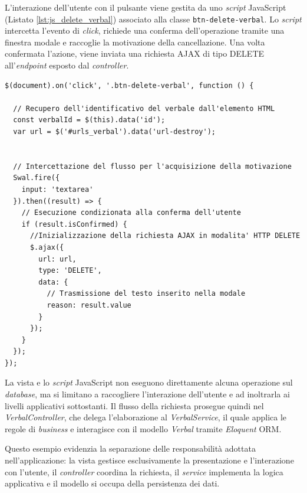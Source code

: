 L'interazione dell'utente con il pulsante viene gestita da uno \textit{script} JavaScript (Listato \ref{lst:js_delete_verbal}) associato alla classe \texttt{btn-delete-verbal}. Lo \textit{script} intercetta l'evento di \textit{click}, richiede una conferma dell'operazione tramite una finestra modale e raccoglie la motivazione della cancellazione. Una volta confermata l'azione, viene inviata una richiesta AJAX di tipo DELETE all'\textit{endpoint} esposto dal \textit{controller}.

\begin{lstlisting}[float=!t, caption={Gestione dell'evento click e sottomissione della richiesta AJAX tramite jQuery.}, captionpos=b, label={lst:js_delete_verbal}, basicstyle=\ttfamily\footnotesize]
$(document).on('click', '.btn-delete-verbal', function () {
	
  // Recupero dell'identificativo del verbale dall'elemento HTML
  const verbalId = $(this).data('id');
  var url = $('#urls_verbal').data('url-destroy');
	
	
  // Intercettazione del flusso per l'acquisizione della motivazione
  Swal.fire({
  	input: 'textarea'
  }).then((result) => {
	// Esecuzione condizionata alla conferma dell'utente
	if (result.isConfirmed) {
	  //Inizializzazione della richiesta AJAX in modalita' HTTP DELETE
	  $.ajax({
		url: url,
		type: 'DELETE',
		data: {
		  // Trasmissione del testo inserito nella modale
		  reason: result.value 
		}
	  });
	}
  });	
});
\end{lstlisting}

La vista e lo \textit{script} JavaScript non eseguono direttamente alcuna operazione sul \textit{database}, ma si limitano a raccogliere l'interazione dell'utente e ad inoltrarla ai livelli applicativi sottostanti. Il flusso della richiesta prosegue quindi nel \textit{VerbalController}, che delega l'elaborazione al \textit{VerbalService}, il quale applica le regole di \textit{business} e interagisce con il modello \textit{Verbal} tramite \textit{Eloquent} ORM.

Questo esempio evidenzia la separazione delle responsabilità adottata nell'applicazione: la vista gestisce esclusivamente la presentazione e l'interazione con l'utente, il \textit{controller} coordina la richiesta, il \textit{service} implementa la logica applicativa e il modello si occupa della persistenza dei dati.

